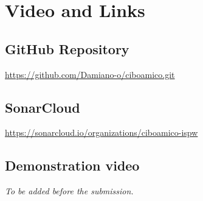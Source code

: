 \chapter{Video and Links}
\label{cap:links}

\section{GitHub Repository}
\url{https://github.com/Damiano-o/ciboamico.git}

\section{SonarCloud}
\url{https://sonarcloud.io/organizations/ciboamico-ispw}

\section{Demonstration video}
\emph{To be added before the submission.}
